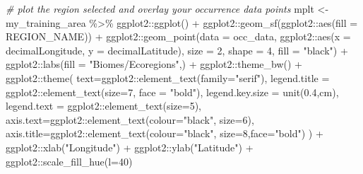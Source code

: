 \documentclass[
]{article}
\newenvironment{Shaded}{\begin{snugshade}}{\end{snugshade}}
\newcommand{\AttributeTok}[1]{\textcolor[rgb]{0.77,0.63,0.00}{#1}}
\newcommand{\CommentTok}[1]{\textcolor[rgb]{0.56,0.35,0.01}{\textit{#1}}}
\newcommand{\DecValTok}[1]{\textcolor[rgb]{0.00,0.00,0.81}{#1}}
\newcommand{\FloatTok}[1]{\textcolor[rgb]{0.00,0.00,0.81}{#1}}
\newcommand{\FunctionTok}[1]{\textcolor[rgb]{0.00,0.00,0.00}{#1}}
\newcommand{\NormalTok}[1]{#1}
\newcommand{\OtherTok}[1]{\textcolor[rgb]{0.56,0.35,0.01}{#1}}
\newcommand{\SpecialCharTok}[1]{\textcolor[rgb]{0.00,0.00,0.00}{#1}}
\newcommand{\StringTok}[1]{\textcolor[rgb]{0.31,0.60,0.02}{#1}}
\begin{document}
\begin{Shaded}
\begin{Highlighting}[]
 
  \CommentTok{\# plot the region selected and overlay your occurrence data points}
\NormalTok{  mplt }\OtherTok{\textless{}{-}}\NormalTok{ my\_training\_area }\SpecialCharTok{\%\textgreater{}\%}\NormalTok{ ggplot2}\SpecialCharTok{::}\FunctionTok{ggplot}\NormalTok{() }\SpecialCharTok{+}
\NormalTok{    ggplot2}\SpecialCharTok{::}\FunctionTok{geom\_sf}\NormalTok{(ggplot2}\SpecialCharTok{::}\FunctionTok{aes}\NormalTok{(}\AttributeTok{fill =}\NormalTok{ REGION\_NAME)) }\SpecialCharTok{+}
\NormalTok{    ggplot2}\SpecialCharTok{::}\FunctionTok{geom\_point}\NormalTok{(}\AttributeTok{data =}\NormalTok{ occ\_data, }
\NormalTok{                        ggplot2}\SpecialCharTok{::}\FunctionTok{aes}\NormalTok{(}\AttributeTok{x =}\NormalTok{ decimalLongitude, }\AttributeTok{y =}\NormalTok{ decimalLatitude),}
                        \AttributeTok{size =} \DecValTok{2}\NormalTok{,                                                }
                        \AttributeTok{shape =} \DecValTok{4}\NormalTok{,                                              }
                        \AttributeTok{fill =} \StringTok{"black"}\NormalTok{) }\SpecialCharTok{+}                                       
\NormalTok{    ggplot2}\SpecialCharTok{::}\FunctionTok{labs}\NormalTok{(}\AttributeTok{fill =} \StringTok{"Biomes/Ecoregions"}\NormalTok{,) }\SpecialCharTok{+} 
\NormalTok{    ggplot2}\SpecialCharTok{::}\FunctionTok{theme\_bw}\NormalTok{() }\SpecialCharTok{+} 
\NormalTok{    ggplot2}\SpecialCharTok{::}\FunctionTok{theme}\NormalTok{(}
    \AttributeTok{text=}\NormalTok{ggplot2}\SpecialCharTok{::}\FunctionTok{element\_text}\NormalTok{(}\AttributeTok{family=}\StringTok{"serif"}\NormalTok{),}
    \AttributeTok{legend.title =}\NormalTok{ ggplot2}\SpecialCharTok{::}\FunctionTok{element\_text}\NormalTok{(}\AttributeTok{size=}\DecValTok{7}\NormalTok{, }\AttributeTok{face =} \StringTok{"bold"}\NormalTok{),}
    \AttributeTok{legend.key.size =} \FunctionTok{unit}\NormalTok{(}\FloatTok{0.4}\NormalTok{,}\StringTok{\textquotesingle{}cm\textquotesingle{}}\NormalTok{),}
    \AttributeTok{legend.text =}\NormalTok{ ggplot2}\SpecialCharTok{::}\FunctionTok{element\_text}\NormalTok{(}\AttributeTok{size=}\DecValTok{5}\NormalTok{),}
    \AttributeTok{axis.text=}\NormalTok{ggplot2}\SpecialCharTok{::}\FunctionTok{element\_text}\NormalTok{(}\AttributeTok{colour=}\StringTok{"black"}\NormalTok{, }\AttributeTok{size=}\DecValTok{6}\NormalTok{),}
    \AttributeTok{axis.title=}\NormalTok{ggplot2}\SpecialCharTok{::}\FunctionTok{element\_text}\NormalTok{(}\AttributeTok{colour=}\StringTok{"black"}\NormalTok{, }\AttributeTok{size=}\DecValTok{8}\NormalTok{,}\AttributeTok{face=}\StringTok{"bold"}\NormalTok{)}
\NormalTok{    ) }\SpecialCharTok{+}
\NormalTok{    ggplot2}\SpecialCharTok{::}\FunctionTok{xlab}\NormalTok{(}\StringTok{"Longitude"}\NormalTok{) }\SpecialCharTok{+}\NormalTok{ ggplot2}\SpecialCharTok{::}\FunctionTok{ylab}\NormalTok{(}\StringTok{"Latitude"}\NormalTok{) }\SpecialCharTok{+} 
\NormalTok{    ggplot2}\SpecialCharTok{::}\FunctionTok{scale\_fill\_hue}\NormalTok{(}\AttributeTok{l=}\DecValTok{40}\NormalTok{)}
    

\end{Highlighting}
\end{Shaded}
\end{document}
